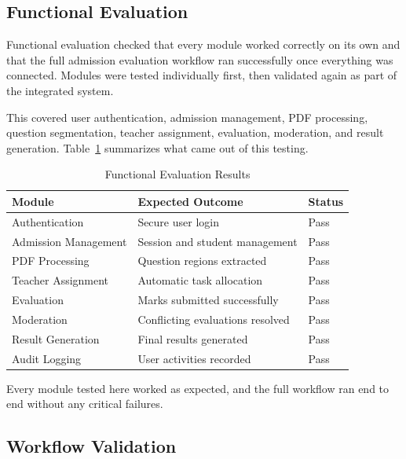 \subsection{Functional Evaluation}

Functional evaluation checked that every module worked correctly on its own and that the full admission evaluation workflow ran successfully once everything was connected. Modules were tested individually first, then validated again as part of the integrated system.

This covered user authentication, admission management, PDF processing, question segmentation, teacher assignment, evaluation, moderation, and result generation. Table~\ref{tab:functional_evaluation} summarizes what came out of this testing.

\begin{table}[H]
\centering
\caption{Functional Evaluation Results}
\label{tab:functional_evaluation}
\renewcommand{\arraystretch}{1.2}

\begin{tabular}{|p{6cm}|p{6cm}|p{1.6cm}|}
\hline
\textbf{Module} & \textbf{Expected Outcome} & \textbf{Status} \\
\hline
Authentication & Secure user login & Pass \\
\hline
Admission Management & Session and student management & Pass \\
\hline
PDF Processing & Question regions extracted & Pass \\
\hline
Teacher Assignment & Automatic task allocation & Pass \\
\hline
Evaluation & Marks submitted successfully & Pass \\
\hline
Moderation & Conflicting evaluations resolved & Pass \\
\hline
Result Generation & Final results generated & Pass \\
\hline
Audit Logging & User activities recorded & Pass \\
\hline
\end{tabular}

\end{table}

Every module tested here worked as expected, and the full workflow ran end to end without any critical failures.

\subsection{Workflow Validation}

